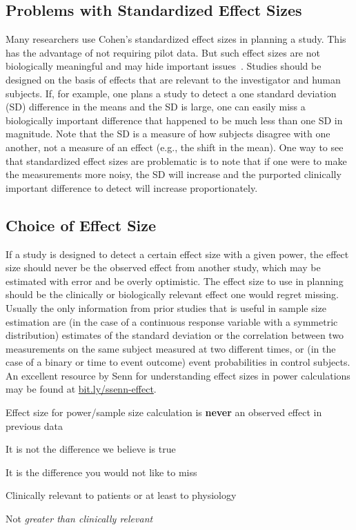 \subsection{Problems with Standardized Effect Sizes}
Many researchers use Cohen's standardized effect sizes in planning a
study. This has the advantage of not requiring pilot data. But such
effect sizes are not biologically meaningful and may hide important
issues~\cite{len01som}. Studies should be designed on the basis
of effects that are relevant to the investigator and human
subjects. If, for example, one plans a study to detect a one standard
deviation (SD) difference in the means and the SD is large, one can
easily miss a biologically important difference that happened to be
much less than one SD in magnitude. Note that the SD is a measure of
how subjects disagree with one another, not a measure of an effect
(e.g., the shift in the mean).  One way to see that standardized
effect sizes are problematic is to note that if one were to make the
measurements more noisy, the SD will increase and the purported
clinically important difference to detect will increase proportionately.

\subsection{Choice of Effect Size}
If a study is designed to detect a certain effect size with a given
power, the effect size should never be the observed effect from
another study, which may be estimated with error and be overly
optimistic. The effect size to use in planning should be the
clinically or biologically relevant effect one would regret
missing.  Usually the only information from prior studies that is
useful in sample size estimation are (in the case of a continuous
response variable with a symmetric distribution) estimates of the
standard deviation or the correlation between two measurements on the
same subject measured at two different times, or (in the case of a
binary or time to event outcome) event probabilities in control
subjects.  An excellent resource by Senn for understanding effect
sizes in power calculations may be found at \href{http://bit.ly/ssenn-effect}{bit.ly/ssenn-effect}.

\bi
\item Effect size for power/sample size calculation is \textbf{never} an observed effect in previous data
\item It is not the difference we believe is true
\item It is the difference you would not like to miss
\item Clinically relevant to patients or at least to physiology
\item Not \emph{greater than clinically relevant}
\ei

